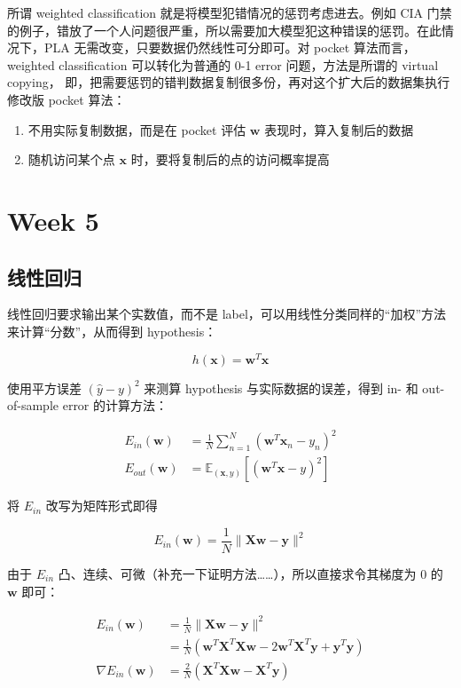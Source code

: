 \documentclass[a4paper]{article}
\begin{document}
所谓 weighted classification 就是将模型犯错情况的惩罚考虑进去。例如 CIA 门禁的例子，错放了一个人问题很严重，所以需要加大模型犯这种错误的惩罚。在此情况下，PLA 无需改变，只要数据仍然线性可分即可。对 pocket 算法而言，weighted classification 可以转化为普通的 0-1 error 问题，方法是所谓的 virtual copying，
即，把需要惩罚的错判数据复制很多份，再对这个扩大后的数据集执行修改版 pocket 算法：

\begin{enumerate}
  \item 不用实际复制数据，而是在 pocket 评估 $\mathbf{w}$ 表现时，算入复制后的数据
  \item 随机访问某个点 $\mathbf{x}$ 时，要将复制后的点的访问概率提高 
\end{enumerate}



\section{Week 5}
\subsection{线性回归}
线性回归要求输出某个实数值，而不是 label，可以用线性分类同样的“加权”方法来计算“分数”，从而得到 hypothesis：

$$h(\mathbf{x}) = \mathbf{w}^T\mathbf{x}$$

使用平方误差 $(\hat{y} - y)^2$ 来测算 hypothesis 与实际数据的误差，得到 in- 和 out-of-sample error 的计算方法：

\begin{equation}
\begin{aligned}
E_{in}(\mathbf{w}) &= \frac{1}{N}\sum_{n=1}^{N}(\mathbf{w}^T\mathbf{x}_n - y_n)^2 \\
E_{out}(\mathbf{w}) &= \mathbb{E}_{(\mathbf{x},y)}[(\mathbf{w}^T\mathbf{x} - y)^2]
\end{aligned}
\end{equation}

将 $E_{in}$ 改写为矩阵形式即得

$$E_{in}(\mathbf{w}) = \frac{1}{N}\|\mathbf{Xw} - \mathbf{y}\|^2$$

由于 $E_{in}$ 凸、连续、可微（补充一下证明方法……），所以直接求令其梯度为 $0$ 的 $\mathbf{w}$ 即可：

\begin{equation}
\begin{aligned}
E_{in}(\mathbf{w}) &= \frac{1}{N}\|\mathbf{Xw} - \mathbf{y}\|^2 \\
                   &= \frac{1}{N} \left ( \mathbf{w}^T\mathbf{X}^T\mathbf{Xw} - 2\mathbf{w}^T\mathbf{X}^T\mathbf{y} + \mathbf{y}^T\mathbf{y} \right ) \\
    \nabla E_{in}(\mathbf{w}) &= \frac{2}{N}(\mathbf{X}^T\mathbf{Xw} - \mathbf{X}^T\mathbf{y})
\end{aligned}
\end{equation}
\end{document}

